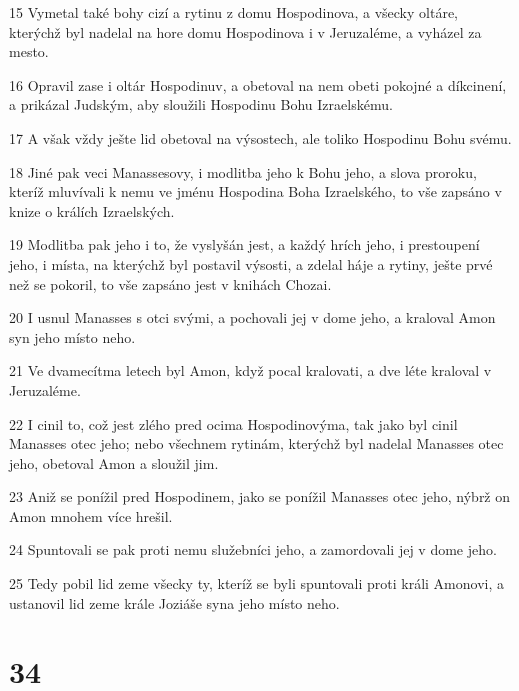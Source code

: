 \par 15 Vymetal také bohy cizí a rytinu z domu Hospodinova, a všecky oltáre, kterýchž byl nadelal na hore domu Hospodinova i v Jeruzaléme, a vyházel za mesto.
\par 16 Opravil zase i oltár Hospodinuv, a obetoval na nem obeti pokojné a díkcinení, a prikázal Judským, aby sloužili Hospodinu Bohu Izraelskému.
\par 17 A však vždy ješte lid obetoval na výsostech, ale toliko Hospodinu Bohu svému.
\par 18 Jiné pak veci Manassesovy, i modlitba jeho k Bohu jeho, a slova proroku, kteríž mluvívali k nemu ve jménu Hospodina Boha Izraelského, to vše zapsáno v knize o králích Izraelských.
\par 19 Modlitba pak jeho i to, že vyslyšán jest, a každý hrích jeho, i prestoupení jeho, i místa, na kterýchž byl postavil výsosti, a zdelal háje a rytiny, ješte prvé než se pokoril, to vše zapsáno jest v knihách Chozai.
\par 20 I usnul Manasses s otci svými, a pochovali jej v dome jeho, a kraloval Amon syn jeho místo neho.
\par 21 Ve dvamecítma letech byl Amon, když pocal kralovati, a dve léte kraloval v Jeruzaléme.
\par 22 I cinil to, což jest zlého pred ocima Hospodinovýma, tak jako byl cinil Manasses otec jeho; nebo všechnem rytinám, kterýchž byl nadelal Manasses otec jeho, obetoval Amon a sloužil jim.
\par 23 Aniž se ponížil pred Hospodinem, jako se ponížil Manasses otec jeho, nýbrž on Amon mnohem více hrešil.
\par 24 Spuntovali se pak proti nemu služebníci jeho, a zamordovali jej v dome jeho.
\par 25 Tedy pobil lid zeme všecky ty, kteríž se byli spuntovali proti králi Amonovi, a ustanovil lid zeme krále Joziáše syna jeho místo neho.

\chapter{34}


